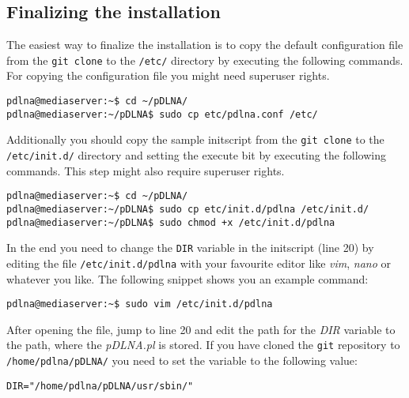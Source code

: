 \subsection{Finalizing the installation}

The easiest way to finalize the installation is to copy the default configuration file from the \verb|git clone| to the \verb|/etc/| directory by executing the following commands. For copying the configuration file you might need superuser rights.
\begin{lstlisting}
pdlna@mediaserver:~$ cd ~/pDLNA/
pdlna@mediaserver:~/pDLNA$ sudo cp etc/pdlna.conf /etc/
\end{lstlisting}
Additionally you should copy the sample initscript from the \verb|git clone| to the \verb|/etc/init.d/| directory and setting the execute bit by executing the following commands. This step might also require superuser rights.
\begin{lstlisting}
pdlna@mediaserver:~$ cd ~/pDLNA/
pdlna@mediaserver:~/pDLNA$ sudo cp etc/init.d/pdlna /etc/init.d/
pdlna@mediaserver:~/pDLNA$ sudo chmod +x /etc/init.d/pdlna
\end{lstlisting}
In the end you need to change the \verb|DIR| variable in the initscript (line 20) by editing the file \verb|/etc/init.d/pdlna| with your favourite editor like {\em vim}, {\em nano} or whatever you like. The following snippet shows you an example command:
\begin{lstlisting}
pdlna@mediaserver:~$ sudo vim /etc/init.d/pdlna
\end{lstlisting}
After opening the file, jump to line 20 and edit the path for the {\em DIR} variable to the path, where the {\em pDLNA.pl} is stored. If you have cloned the \verb|git| repository to \verb|/home/pdlna/pDLNA/| you need to set the variable to the following value:
\begin{colframefile}
\begin{verbatim}
DIR="/home/pdlna/pDLNA/usr/sbin/"
\end{verbatim}
\end{colframefile}

